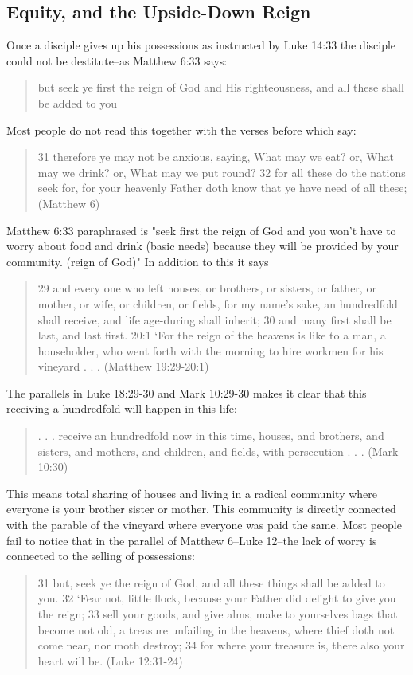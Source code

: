 \documentclass[11pt]{article}
\begin{document}
\subsection{Equity, and the Upside-Down Reign}
Once a disciple gives up his possessions as instructed by Luke 14:33 the disciple could not be destitute--as Matthew 6:33 says: 
\begin{quote}
but seek ye first the reign of God and His righteousness, and all these shall be added to you
\end{quote}
Most people do not read this together with the verses before which say:
\begin{quote}
31 therefore ye may not be anxious, saying, What may we eat? or, What may we drink? or, What may we put round? 32 for all these do the nations seek for, for your heavenly Father doth know that ye have need of all these; (Matthew 6) 
\end{quote}
Matthew 6:33 paraphrased is "seek first the reign of God and you won't have to worry about food and drink (basic needs) because they will be provided by your community. (reign of God)" In addition to this it says 
\begin{quote}
29 and every one who left houses, or brothers, or sisters, or father, or mother, or wife, or children, or fields, for my name's sake, an hundredfold shall receive, and life age-during shall inherit; 30 and many first shall be last, and last first. 20:1 `For the reign of the heavens is like to a man, a householder, who went forth with the morning to hire workmen for his vineyard . . . (Matthew 19:29-20:1)
\end{quote}
The parallels in Luke 18:29-30 and Mark 10:29-30 makes it clear that this receiving a hundredfold will happen in this life: 
\begin{quote}
. . . receive an hundredfold now in this time, houses, and brothers, and sisters, and mothers, and children, and fields, with persecution . . . (Mark 10:30) 
\end{quote}
This means total sharing of houses and living in a radical community where everyone is your brother sister or mother. This community is directly connected with the parable of the vineyard where everyone was paid the same. Most people fail to notice that in the parallel of Matthew 6--Luke 12--the lack of worry is connected to the selling of possessions:
\begin{quote}
31 but, seek ye the reign of God, and all these things shall be added to you.
32 `Fear not, little flock, because your Father did delight to give you the reign;
33 sell your goods, and give alms, make to yourselves bags that become not old, a treasure unfailing in the heavens, where thief doth not come near, nor moth destroy;
34 for where your treasure is, there also your heart will be. (Luke 12:31-24)
\end{quote}
\end{document}
